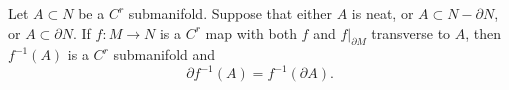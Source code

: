 Let $A \subset N$ be a $C^r$ submanifold. Suppose that either $A$ is neat, or $A \subset N - \partial N$, or $A \subset \partial N$. If $f: M \to N$ is a $C^r$ map with both $f$ and $f|_{\partial M}$ transverse to $A$, then $f^{-1}(A)$ is a $C^r$ submanifold and
$$\partial f^{-1}(A) = f^{-1}(\partial A).$$
